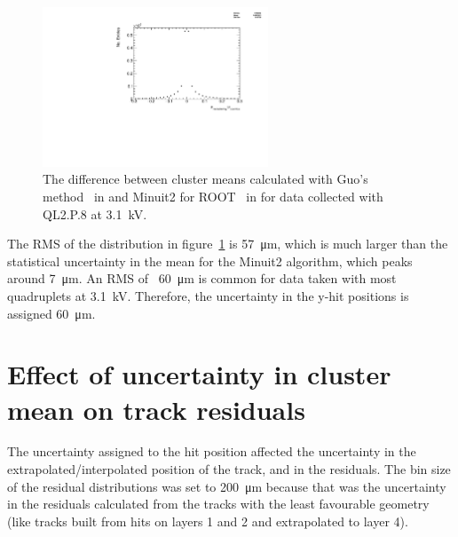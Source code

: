 \begin{figure}
    \centering
    \includegraphics[width = 0.6\textwidth]{figures/figure_QL2P08_3100V_2021-05-21_reclustering_plots_mu_reclustering_minus_mu_cosmics.pdf}
    \caption{The difference between cluster means calculated with Guo's method~\cite{guo_simple_2011} in  and Minuit2 for ROOT~\cite{hatlo_developments_2005} in  for data collected with QL2.P.8 at 3.1~kV.}
    \label{fig:mu_reclustering_minus_mu_cosmics}
\end{figure}

The RMS of the distribution in figure~\ref{fig:mu_reclustering_minus_mu_cosmics} is \SI{57}{\micro\meter}, which is much larger than the statistical uncertainty in the mean for the Minuit2 algorithm, which peaks around \SI{7}{\micro\meter}. An RMS of ~\SI{60}{\micro\meter} is common for data taken with most quadruplets at 3.1~kV. Therefore, the uncertainty in the y-hit positions is assigned \SI{60}{\micro\meter}.

\section{Effect of uncertainty in cluster mean on track residuals}

\label{sec:appendix_clustering_track_residuals}
The uncertainty assigned to the hit position affected the uncertainty in the extrapolated/interpolated position of the track, and in the residuals. The bin size of the residual distributions was set to \SI{200}{\micro\meter} because that was the uncertainty in the residuals calculated from the tracks with the least favourable geometry (like tracks built from hits on layers 1 and 2 and extrapolated to layer 4). 